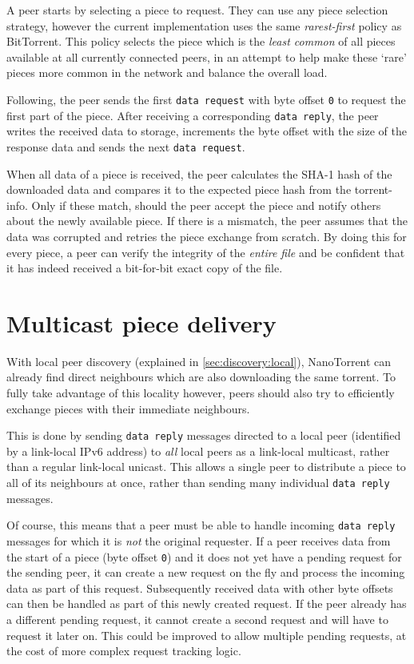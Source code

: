 A peer starts by selecting a piece to request. They can use any piece selection strategy, however the current implementation uses the same \emph{rarest-first} policy as BitTorrent. This policy selects the piece which is the \emph{least common} of all pieces available at all currently connected peers, in an attempt to help make these `rare' pieces more common in the network and balance the overall load.

Following, the peer sends the first \texttt{data request} with byte offset \texttt{0} to request the first part of the piece. After receiving a corresponding \texttt{data reply}, the peer writes the received data to storage, increments the byte offset with the size of the response data and sends the next \texttt{data request}.

When all data of a piece is received, the peer calculates the SHA-1 hash of the downloaded data and compares it to the expected piece hash from the \gls{torrent-info}. Only if these match, should the peer accept the piece and notify others about the newly available piece. If there is a mismatch, the peer assumes that the data was corrupted and retries the piece exchange from scratch. By doing this for every piece, a peer can verify the integrity of the \emph{entire file} and be confident that it has indeed received a bit-for-bit exact copy of the file.

\section{Multicast piece delivery}
\label{sec:distrib:multicast}
With local peer discovery (explained in \ref{sec:discovery:local}), NanoTorrent can already find direct neighbours which are also downloading the same torrent. To fully take advantage of this locality however, peers should also try to efficiently exchange pieces with their immediate neighbours.

This is done by sending \texttt{data reply} messages directed to a local peer (identified by a link-local \gls{IPv6} address) to \emph{all} local peers as a link-local multicast, rather than a regular link-local unicast. This allows a single peer to distribute a piece to all of its neighbours at once, rather than sending many individual \texttt{data reply} messages.

Of course, this means that a peer must be able to handle incoming \texttt{data reply} messages for which it is \emph{not} the original requester. If a peer receives data from the start of a piece (byte offset \texttt{0}) and it does not yet have a pending request for the sending peer, it can create a new request on the fly and process the incoming data as part of this request. Subsequently received data with other byte offsets can then be handled as part of this newly created request. If the peer already has a different pending request, it cannot create a second request and will have to request it later on. This could be improved to allow multiple pending requests, at the cost of more complex request tracking logic.

